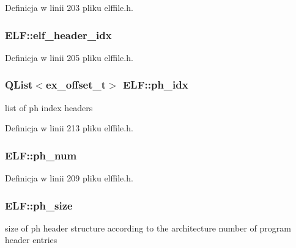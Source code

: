 Definicja w linii 203 pliku elffile.\-h.

\hypertarget{class_e_l_f_abf3b4ff3bf04249f73a62c5819beddd1}{
\subsubsection[{elf\-\_\-header\-\_\-idx}]{ E\-L\-F\-::elf\-\_\-header\-\_\-idx\hspace{0.3cm}{\ttfamily [private]}}}\label{class_e_l_f_abf3b4ff3bf04249f73a62c5819beddd1}


Definicja w linii 205 pliku elffile.\-h.

\hypertarget{class_e_l_f_a66548f1b1a7f91f5c784cb684493f75e}{
\subsubsection[{ph\-\_\-idx}]{\setlength{\rightskip}{0pt plus 5cm}Q\-List$<${\bf ex\-\_\-offset\-\_\-t}$>$ E\-L\-F\-::ph\-\_\-idx\hspace{0.3cm}{\ttfamily [private]}}}\label{class_e_l_f_a66548f1b1a7f91f5c784cb684493f75e}


list of ph index headers 



Definicja w linii 213 pliku elffile.\-h.

\hypertarget{class_e_l_f_a407fa88b371e09b518d519f5614da5ba}{
\subsubsection[{ph\-\_\-num}]{ E\-L\-F\-::ph\-\_\-num\hspace{0.3cm}{\ttfamily [private]}}}\label{class_e_l_f_a407fa88b371e09b518d519f5614da5ba}


Definicja w linii 209 pliku elffile.\-h.

\hypertarget{class_e_l_f_ad3d418d35d3688f21989b20ae4e8c7d6}{
\subsubsection[{ph\-\_\-size}]{ E\-L\-F\-::ph\-\_\-size\hspace{0.3cm}{\ttfamily [private]}}}\label{class_e_l_f_ad3d418d35d3688f21989b20ae4e8c7d6}
size of ph header structure according to the architecture number of program header entries 

